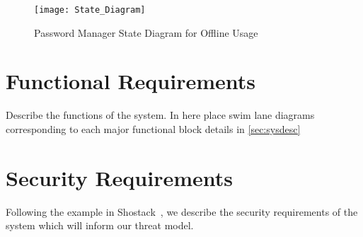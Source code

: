 \begin{figure}[h]
    \centering
    \texttt{[image: State\_Diagram]}
    \caption{Password Manager State Diagram for Offline Usage}
    \label{fig:state_diagram}
\end{figure}

\section{Functional Requirements}
\label{sec:funcreq}
Describe the functions of the system.  In here place swim lane
diagrams corresponding to each major functional block details in
\ref{sec:sysdesc}

\section{Security Requirements}
\label{sec:secreqs}
Following the example in Shostack~\cite{shostackbook}, we describe the
security requirements of the system which will inform our threat
model.
